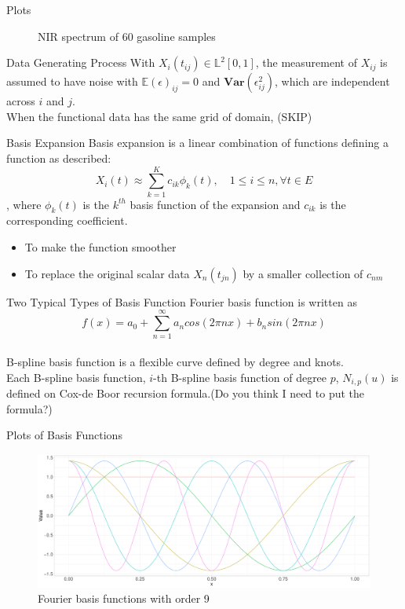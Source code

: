 \documentclass{beamer}
\begin{document}
\begin{frame}{Plots}
\begin{figure}
\begin{minipage}{.5\textwidth}
				\caption {\tiny NIR spectrum of 60 gasoline samples}
			\end{minipage}
		\end{figure}
	\end{frame}
	
	\begin{frame}{Data Generating Process}
		With $X_{i}(t_{ij}) \in \mathbb{L}^{2}[0,1]$, the measurement of $X_{ij}$ is assumed to have noise with $\mathbb{E}(\epsilon)_{ij}=0$ and $\textbf{Var}(\epsilon_{ij}^{2})$, which are independent across $i$ and $j$.\\
		When the functional data has the same grid of domain, (SKIP)	
	\end{frame}

	\begin{frame}{Basis Expansion}
		Basis expansion is a linear combination of functions defining a function as described:
		$$X_{i}(t) \approx \sum_{k=1}^{K} c_{ik}\phi_{k}(t), \quad 1\leq i \leq n, \forall t \in E$$
		, where $\phi_{k}(t)$ is the $k^{th}$ basis function of the expansion and $c_{ik}$ is the corresponding coefficient.
		\begin{itemize}
			\item To make the function smoother
			\item To replace the original scalar data $X_{n}(t_{jn})$ by a smaller collection of $c_{nm}$
		\end{itemize}		
	\end{frame}
	
	\begin{frame}{Two Typical Types of Basis Function}
		Fourier basis function is written as
		$$f(x) = a_{0} + \sum_{n=1}^{\infty}a_{n}cos(2\pi nx) + b_{n}sin(2\pi nx)$$	\\
		\vspace{2\baselineskip}
		B-spline basis function is a flexible curve defined by degree and knots. \\
		Each B-spline basis function, $i$-th B-spline basis function of degree $p$, $N_{i,p}(u)$ is defined on Cox-de Boor recursion formula.(Do you think I need to put the formula?)
	\end{frame}
	
	\begin{frame}{Plots of Basis Functions}
		\begin{figure}
			\includegraphics[height = 4.5cm]{../Graphics/Fourier_Basis.pdf}
			\caption {Fourier basis functions with order 9}
		\end{figure}
			
	\end{frame}
	
\end{document}
